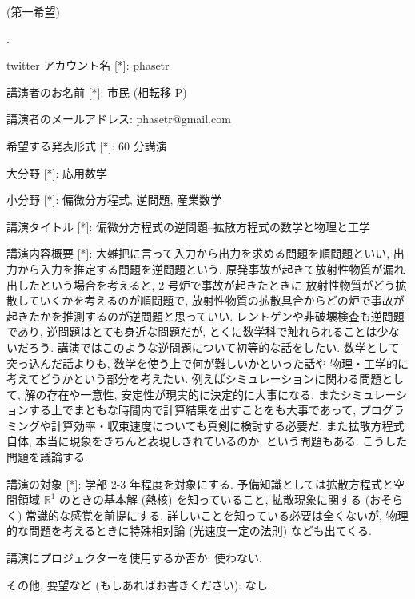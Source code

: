 \documentclass[openany, a4paper, oneside]{book}
\newcounter{enum2}
\renewenvironment{enumerate}{%
\begin{list}%
{%
\arabic{enum2}.\ \,%
}%
{%
\usecounter{enum2}
\setlength{\itemindent}{0pt}%
\setlength{\leftmargin}{6pt}%
\setlength{\rightmargin}{0pt}%
\setlength{\labelsep}{0pt}%
\setlength{\labelwidth}{6pt}%
\setlength{\itemsep}{0pt}%
\setlength{\parsep}{0pt}%
\setlength{\listparindent}{0pt}%
}
}{%
\end{list}%
}
\theoremstyle{break}
\theoremstyle{breakdefn}
\begin{document}
(第一希望)
\begin{enumerate}
\item twitter アカウント名 [*]: phasetr
\item 講演者のお名前 [*]: 市民 (相転移 P)
\item 講演者のメールアドレス: phasetr@gmail.com
\item 希望する発表形式 [*]: 60 分講演
\item 大分野 [*]: 応用数学
\item 小分野 [*]: 偏微分方程式, 逆問題, 産業数学
\item 講演タイトル [*]: 偏微分方程式の逆問題--拡散方程式の数学と物理と工学
\item 講演内容概要 [*]: 大雑把に言って入力から出力を求める問題を順問題といい,
   出力から入力を推定する問題を逆問題という.
   原発事故が起きて放射性物質が漏れ出したという場合を考えると, 2 号炉で事故が起きたときに
   放射性物質がどう拡散していくかを考えるのが順問題で,
   放射性物質の拡散具合からどの炉で事故が起きたかを推測するのが逆問題と思っていい.
   レントゲンや非破壊検査も逆問題であり,
   逆問題はとても身近な問題だが, とくに数学科で触れられることは少ないだろう.
   講演ではこのような逆問題について初等的な話をしたい.
   数学として突っ込んだ話よりも, 数学を使う上で何が難しいかといった話や
   物理・工学的に考えてどうかという部分を考えたい.
   例えばシミュレーションに関わる問題として, 解の存在や一意性, 安定性が現実的に決定的に大事になる.
   またシミュレーションする上でまともな時間内で計算結果を出すことをも大事であって,
   プログラミングや計算効率・収束速度についても真剣に検討する必要だ.
   また拡散方程式自体, 本当に現象をきちんと表現しきれているのか, という問題もある.
   こうした問題を議論する.
\item 講演の対象 [*]: 学部 2-3 年程度を対象にする.
   予備知識としては拡散方程式と空間領域 $\mathbb{R}^1$ のときの基本解 (熱核) を知っていること,
   拡散現象に関する (おそらく) 常識的な感覚を前提にする.
   詳しいことを知っている必要は全くないが,
   物理的な問題を考えるときに特殊相対論 (光速度一定の法則) なども出てくる.
\item 講演にプロジェクターを使用するか否か: 使わない.
\item その他, 要望など (もしあればお書きください): なし.
\end{enumerate}
\end{document}

